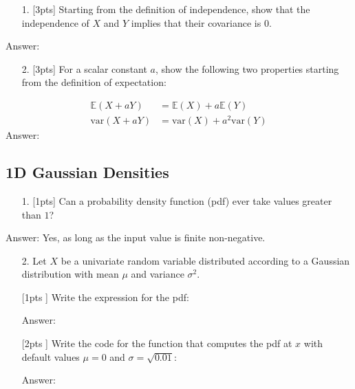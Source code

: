\documentclass[12pt,a4paper]{article}
\begin{document}
\begin{itemize}
\item[1. ] [3pts] Starting from the definition of independence, show that the independence of $X$ and $Y$ implies that their covariance is $0$.

\end{itemize}
Answer:

\begin{itemize}
\item[2. ] [3pts] For a scalar constant $a$, show the following two properties starting from the definition of expectation:

\end{itemize}

\begin{align}
\mathbb{E}(X+aY) &= \mathbb{E}(X) + a\mathbb{E}(Y)\\
\text{var}(X + aY) &= \text{var}(X) + a^2 \text{var}(Y)
\end{align}
Answer:

\subsection{1D Gaussian Densities}
\begin{itemize}
\item[1. ] [1pts] Can a probability density function (pdf) ever take values greater than $1$?

\end{itemize}
Answer: Yes, as long as the input value is finite non-negative.

\begin{itemize}
\item[2. ] Let $X$ be a univariate random variable distributed according to a Gaussian distribution with mean $\mu$ and variance $\sigma^2$.

\end{itemize}
\begin{itemize}
\item [[1pts]] Write the expression for the pdf:

Answer:


\item [[2pts]] Write the code for the function that computes the pdf at $x$ with default values $\mu=0$ and $\sigma = \sqrt{0.01}$:

Answer:

\end{itemize}
\end{document}
